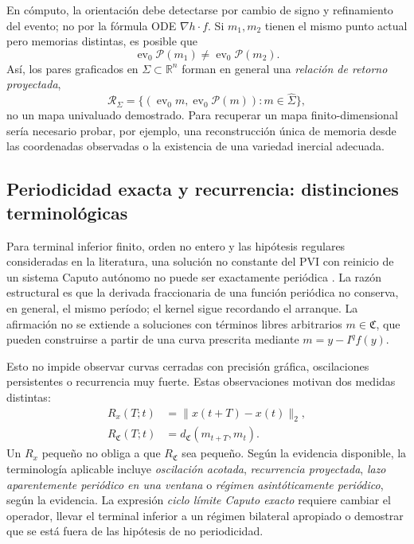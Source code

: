 En cómputo, la orientación debe detectarse por cambio de signo y refinamiento
del evento; no por la fórmula ODE \(\nabla h\cdot f\). Si \(m_1,m_2\) tienen
el mismo punto actual pero memorias distintas, es posible que
\begin{equation}
 \operatorname{ev}_0\mathcal P(m_1)\neq
 \operatorname{ev}_0\mathcal P(m_2).
 \label{eq:geofo-multivalued-projection}
\end{equation}
Así, los pares graficados en \(\Sigma\subset\mathbb R^n\) forman en general
una \emph{relación de retorno proyectada},
\begin{equation}
 \mathcal R_\Sigma=
 \{(\operatorname{ev}_0m,
 \operatorname{ev}_0\mathcal P(m)):m\in\widehat\Sigma\},
 \label{eq:geofo-projected-return-relation}
\end{equation}
no un mapa univaluado demostrado. Para recuperar un mapa finito-dimensional
sería necesario probar, por ejemplo, una reconstrucción única de memoria desde
las coordenadas observadas o la existencia de una variedad inercial adecuada.



\subsection{Periodicidad exacta y recurrencia: distinciones terminológicas}

Para terminal inferior finito, orden no entero y las hipótesis regulares
consideradas en la literatura, una solución no constante del PVI con reinicio
de un sistema Caputo autónomo no puede ser exactamente periódica
\cite{TavazoeiHaeri2009,KaslikSivasundaram2012}. La razón estructural es que la
derivada fraccionaria de una función periódica no conserva, en general, el
mismo período; el kernel sigue recordando el arranque.
La afirmación no se extiende a soluciones con términos libres arbitrarios
\(m\in\mathfrak C\), que pueden construirse a partir de una curva
prescrita mediante \(m=y-I^qf(y)\).

Esto no impide observar curvas cerradas con precisión gráfica, oscilaciones
persistentes o recurrencia muy fuerte. Estas observaciones motivan dos medidas
distintas:
\begin{align}
 R_x(T;t)&=\|x(t+T)-x(t)\|_2,
 \label{eq:geofo-point-recurrence}\\
 R_{\mathfrak C}(T;t)&=
 d_{\mathfrak C}(m_{t+T},m_t).
 \label{eq:geofo-memory-recurrence}
\end{align}
Un \(R_x\) pequeño no obliga a que \(R_{\mathfrak C}\) sea pequeño. Según la
evidencia disponible, la terminología aplicable incluye \emph{oscilación acotada},
\emph{recurrencia proyectada}, \emph{lazo aparentemente periódico en una
ventana} o \emph{régimen asintóticamente periódico}, según la evidencia. La
expresión \emph{ciclo límite Caputo exacto} requiere cambiar el operador, llevar
el terminal inferior a un régimen bilateral apropiado o demostrar que se está
fuera de las hipótesis de no periodicidad.

